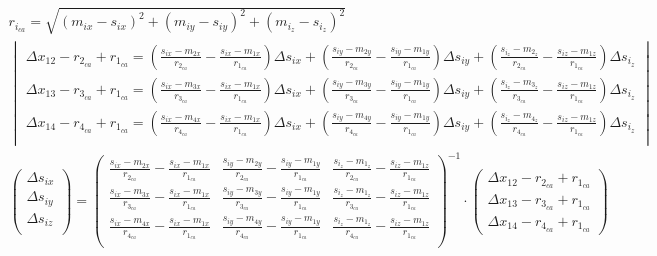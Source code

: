 \begin{gather*}
    r_{i_{ca}} = \sqrt{(m_{ix} - s_{ix})^2 + (m_{iy} - s_{iy})^2 + (m_{i_z} - s_{i_z})^2}\\
    \begin{vmatrix}
        \Delta{x_{12}} - r_{2_{ca}} + r_{1_{ca}} = \left(\frac{s_{ix} - m_{2x}}{r_{2_{ca}}} - \frac{s_{ix} - m_{1x}}{r_{1_{ca}}} \right) \Delta{s}_{ix} + \left(\frac{s_{iy} - m_{2y}}{r_{2_{ca}}} - \frac{s_{iy} - m_{1y}}{r_{1_{ca}}} \right)  \Delta{s}_{iy} + \left(\frac{s_{i_z} - m_{2_z}}{r_{2_{ca}}} - \frac{s_{iz} - m_{1z}}{r_{1_{ca}}} \right)  \Delta{s}_{i_z} \\
        \Delta{x_{13}} - r_{3_{ca}} + r_{1_{ca}} = \left(\frac{s_{ix} - m_{3x}}{r_{3_{ca}}} - \frac{s_{ix} - m_{1x}}{r_{1_{ca}}} \right) \Delta{s}_{ix} + \left(\frac{s_{iy} - m_{3y}}{r_{3_{ca}}} - \frac{s_{iy} - m_{1y}}{r_{1_{ca}}} \right)  \Delta{s}_{iy} + \left(\frac{s_{i_z} - m_{3_z}}{r_{3_{ca}}} - \frac{s_{iz} - m_{1z}}{r_{1_{ca}}} \right)  \Delta{s}_{i_z} \\
        \Delta{x_{14}} - r_{4_{ca}} + r_{1_{ca}} = \left(\frac{s_{ix} - m_{4x}}{r_{4_{ca}}} - \frac{s_{ix} - m_{1x}}{r_{1_{ca}}} \right) \Delta{s}_{ix} + \left(\frac{s_{iy} - m_{4y}}{r_{4_{ca}}} - \frac{s_{iy} - m_{1y}}{r_{1_{ca}}} \right)  \Delta{s}_{iy} + \left(\frac{s_{i_z} - m_{4_z}}{r_{4_{ca}}} - \frac{s_{iz} - m_{1z}}{r_{1_{ca}}} \right)  \Delta{s}_{i_z} \\
    \end{vmatrix}\\
    \begin{pmatrix}
        {\Delta{s}}_{ix} \\
        {\Delta{s}}_{iy} \\
        {\Delta{s}}_{iz} \\
    \end{pmatrix}
    =
    {\begin{pmatrix}
          \frac{s_{ix} - m_{2x}}{r_{2_{ca}}} - \frac{s_{ix} - m_{1x}}{r_{1_{ca}}} & \frac{s_{iy} - m_{2y}}{r_{2_{ca}}} - \frac{s_{iy} - m_{1y}}{r_{1_{ca}}} & \frac{s_{i_z} - m_{1_z}}{r_{2_{ca}}} - \frac{s_{iz} - m_{1z}}{r_{1_{ca}}} \\
          \frac{s_{ix} - m_{3x}}{r_{3_{ca}}} - \frac{s_{ix} - m_{1x}}{r_{1_{ca}}} & \frac{s_{iy} - m_{3y}}{r_{3_{ca}}} - \frac{s_{iy} - m_{1y}}{r_{1_{ca}}} & \frac{s_{i_z} - m_{1_z}}{r_{3_{ca}}} - \frac{s_{iz} - m_{1z}}{r_{1_{ca}}} \\
          \frac{s_{ix} - m_{4x}}{r_{4_{ca}}} - \frac{s_{ix} - m_{1x}}{r_{1_{ca}}} & \frac{s_{iy} - m_{4y}}{r_{4_{ca}}} - \frac{s_{iy} - m_{1y}}{r_{1_{ca}}} & \frac{s_{i_z} - m_{1_z}}{r_{4_{ca}}} - \frac{s_{iz} - m_{1z}}{r_{1_{ca}}} \\
      \end{pmatrix}}^{-1}
    \cdot
    \begin{pmatrix}
        \Delta{x_{12}} - r_{2_{ca}} + r_{1_{ca}}\\
        \Delta{x_{13}} - r_{3_{ca}} + r_{1_{ca}}\\
        \Delta{x_{14}} - r_{4_{ca}} + r_{1_{ca}}
    \end{pmatrix}
\end{gather*}

